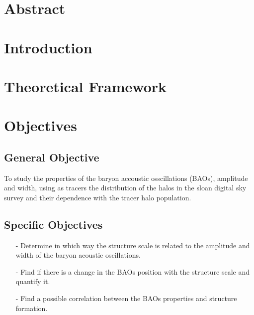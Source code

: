 \documentclass[a4,useAMS,usenatbib,usegraphicx,12pt]{article}
\begin{document}
\section{Abstract}
\newpage


\section{Introduction}


\section{Theoretical Framework}


\section{Objectives}

\subsection*{General Objective}

To study the properties of the baryon accoustic osscillations (BAOs), amplitude and width, using as 
tracers the distribution of the halos in the sloan digital sky survey and their dependence with the tracer 
halo population. 

\subsection*{Specific Objectives}

\begin{enumerate}

\item[-] Determine in which way the structure scale is related to the amplitude and width of the baryon
acoustic oscillations. 

\item[-] Find if there is a change in the BAOs position with the structure scale and quantify it. 

\item[-] Find a possible correlation between the BAOs properties and structure formation. 

\end{enumerate}
\end{document}

